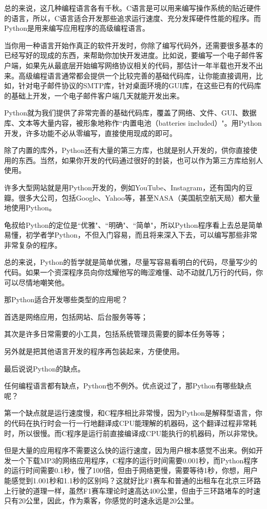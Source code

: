 \documentclass[10pt,a4paper]{ctexbook}
\begin{document}
总的来说，这几种编程语言各有千秋。C语言是可以用来编写操作系统的贴近硬件的语言，所以，C语言适合开发那些追求运行速度、充分发挥硬件性能的程序。而Python是用来编写应用程序的高级编程语言。

当你用一种语言开始作真正的软件开发时，你除了编写代码外，还需要很多基本的已经写好的现成的东西，来帮助你加快开发进度。比如说，要编写一个电子邮件客户端，如果先从最底层开始编写网络协议相关的代码，那估计一年半载也开发不出来。高级编程语言通常都会提供一个比较完善的基础代码库，让你能直接调用，比如，针对电子邮件协议的SMTP库，针对桌面环境的GUI库，在这些已有的代码库的基础上开发，一个电子邮件客户端几天就能开发出来。

Python就为我们提供了非常完善的基础代码库，覆盖了网络、文件、GUI、数据库、文本等大量内容，被形象地称作``内置电池（batteries included）"。用Python开发，许多功能不必从零编写，直接使用现成的即可。

除了内置的库外，Python还有大量的第三方库，也就是别人开发的，供你直接使用的东西。当然，如果你开发的代码通过很好的封装，也可以作为第三方库给别人使用。

许多大型网站就是用Python开发的，例如YouTube、Instagram，还有国内的豆瓣。很多大公司，包括Google、Yahoo等，甚至NASA（美国航空航天局）都大量地使用Python。

龟叔给Python的定位是``优雅"、``明确"、``简单"，所以Python程序看上去总是简单易懂，初学者学Python，不但入门容易，而且将来深入下去，可以编写那些非常非常复杂的程序。

总的来说，Python的哲学就是简单优雅，尽量写容易看明白的代码，尽量写少的代码。如果一个资深程序员向你炫耀他写的晦涩难懂、动不动就几万行的代码，你可以尽情地嘲笑他。

那Python适合开发哪些类型的应用呢？

首选是网络应用，包括网站、后台服务等等；

其次是许多日常需要的小工具，包括系统管理员需要的脚本任务等等；

另外就是把其他语言开发的程序再包装起来，方便使用。

最后说说Python的缺点。

任何编程语言都有缺点，Python也不例外。优点说过了，那Python有哪些缺点呢？

第一个缺点就是运行速度慢，和C程序相比非常慢，因为Python是解释型语言，你的代码在执行时会一行一行地翻译成CPU能理解的机器码，这个翻译过程非常耗时，所以很慢。而C程序是运行前直接编译成CPU能执行的机器码，所以非常快。

但是大量的应用程序不需要这么快的运行速度，因为用户根本感觉不出来。例如开发一个下载MP3的网络应用程序，C程序的运行时间需要0.001秒，而Python程序的运行时间需要0.1秒，慢了100倍，但由于网络更慢，需要等待1秒，你想，用户能感觉到1.001秒和1.1秒的区别吗？这就好比F1赛车和普通的出租车在北京三环路上行驶的道理一样，虽然F1赛车理论时速高达400公里，但由于三环路堵车的时速只有20公里，因此，作为乘客，你感觉的时速永远是20公里。
\end{document}
